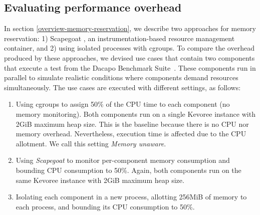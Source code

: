 \subsection{Evaluating performance overhead}
In section \ref{overview-memory-reservation}, we describe two approaches for memory reservation: 1) Scapegoat \cite{gonzalezherrera:hal-00983045}, an instrumentation-based resource management container, and 2) using isolated processes with cgroups. %
To compare the overhead produced by these approaches, we devised use cases that contain two components that execute a test from the Dacapo Benchmark Suite~\cite{Blackburn:2006:DBJ:1167473.1167488}.
These components run in parallel to simulate realistic conditions where components demand resources simultaneously.
The use cases are executed with different settings, as follows:
\begin{enumerate}
\item Using cgroups to assign 50\% of the CPU time to each component (no memory monitoring).
Both components run on a single Kevoree instance with 2GiB maximum heap size.
This is the baseline because there is no CPU nor memory overhead.
Nevertheless, execution time is affected due to the CPU allotment.
We call this setting \textit{Memory unaware}.

\item Using \textit{Scapegoat} to monitor per-component memory consumption and bounding CPU consumption to 50\%.
Again, both components run on the same Kevoree instance with 2GiB maximum heap size.

\item Isolating each component in a new process, allotting 256MiB of memory to each process, and bounding its CPU consumption to 50\%.
\end{enumerate}

%


